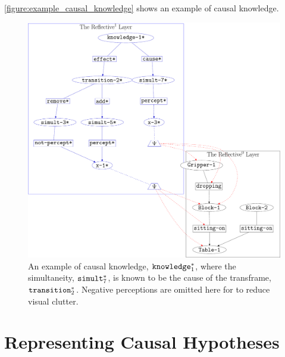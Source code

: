 {\mbox{\autoref{figure:example_causal_knowledge}}} shows an example of
causal knowledge.
\begin{figure}
\center
\includegraphics[width=12cm]{gfx/example_causal_knowledge}
\caption[An example of a causal knowledge.]{An example of causal
  knowledge, $\text{\tt{knowledge}}_1^*$, where the simultaneity,
  $\text{\tt{simult}}_7^*$, is known to be the cause of the
  transframe, $\text{\tt{transition}}_2^*$.  Negative perceptions are
  omitted here for to reduce visual clutter.}
\label{figure:example_causal_knowledge}
\end{figure}

\section{Representing Causal Hypotheses}

